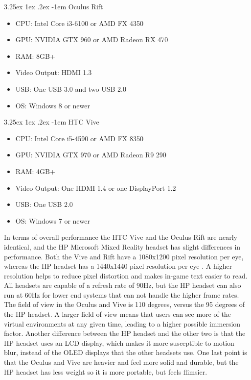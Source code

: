 \documentclass[onecolumn, draftclsnofoot,10pt, compsoc]{IEEEtran}
\makeatletter
\newcounter{subsubsubsection}[subsubsection]
\renewcommand\paragraph{\@startsection{paragraph}{5}{\z@}%
  {3.25ex \@plus1ex \@minus.2ex}%
  {-1em}%
  {\normalfont\normalsize\bfseries}}
\makeatother
\begin{document}
\paragraph{Oculus Rift}
\begin{itemize}
    \item CPU: Intel Core i3-6100 or AMD FX 4350
    \item GPU: NVIDIA GTX 960 or AMD Radeon RX 470
    \item RAM: 8GB+
    \item Video Output: HDMI 1.3
    \item USB: One USB 3.0 and two USB 2.0
    \item OS: Windows 8 or newer
\end{itemize}

\paragraph{HTC Vive}
\begin{itemize}
    \item CPU: Intel Core i5-4590 or AMD FX 8350
    \item GPU: NVIDIA GTX 970 or AMD Radeon R9 290
    \item RAM: 4GB+
    \item Video Output: One HDMI 1.4 or one DisplayPort 1.2
    \item USB: One USB 2.0
    \item OS: Windows 7 or newer
\end{itemize}

In terms of overall performance the HTC Vive and the Oculus Rift are nearly identical, and the HP Microsoft Mixed Reality headset has slight differences in performance. Both the Vive and Rift have a 1080x1200 pixel resolution per eye, whereas the HP headset has a 1440x1440 pixel resolution per eye \cite{headsetCompare}. A higher resolution helps to reduce pixel distortion and makes in-game text easier to read. All headsets are capable of a refresh rate of 90Hz, but the HP headset can also run at 60Hz for lower end systems that can not handle the higher frame rates. The field of view in the Oculus and Vive is 110 degrees, versus the 95 degrees of the HP headset. A larger field of view means that users can see more of the virtual environments at any given time, leading to a higher possible immersion factor. Another difference between the HP headset and the other two is that the HP headset uses an LCD display, which makes it more susceptible to motion blur, instead of the OLED displays that the other headsets use. One last point is that the Oculus and Vive are heavier and feel more solid and durable, but the HP headset has less weight so it is more portable, but feels flimsier. 
\end{document}
